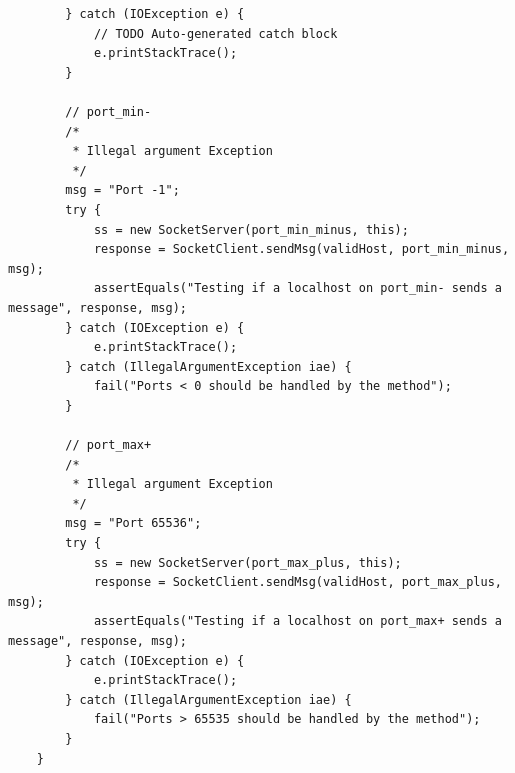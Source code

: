 \documentclass[fontsize=12pt,paper=letter,twoside]{scrartcl}
\begin{document}
\begin{itemize}
\begin{lstlisting}
		} catch (IOException e) {
			// TODO Auto-generated catch block
			e.printStackTrace();
		}

		// port_min-
		/*
		 * Illegal argument Exception
		 */
		msg = "Port -1";
		try {
			ss = new SocketServer(port_min_minus, this);
			response = SocketClient.sendMsg(validHost, port_min_minus, msg);
			assertEquals("Testing if a localhost on port_min- sends a message", response, msg);
		} catch (IOException e) {
			e.printStackTrace();
		} catch (IllegalArgumentException iae) {
			fail("Ports < 0 should be handled by the method");
		}

		// port_max+
		/*
		 * Illegal argument Exception
		 */
		msg = "Port 65536";
		try {
			ss = new SocketServer(port_max_plus, this);
			response = SocketClient.sendMsg(validHost, port_max_plus, msg);
			assertEquals("Testing if a localhost on port_max+ sends a message", response, msg);
		} catch (IOException e) {
			e.printStackTrace();
		} catch (IllegalArgumentException iae) {
			fail("Ports > 65535 should be handled by the method");
		}
	}
\end{lstlisting}
\newpage

\end{itemize}
\end{document}
